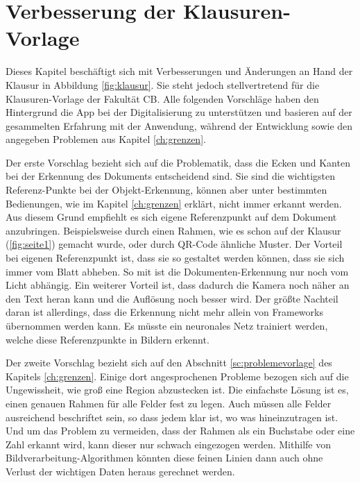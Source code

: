\documentclass[nomenclature, oneside, 150]{HSMW-Thesis}
\begin{document}

\chapter{Verbesserung der Klausuren-Vorlage}\label{ch:vorlage}
	Dieses Kapitel beschäftigt sich mit Verbesserungen und Änderungen an Hand der Klausur in Abbildung \ref{fig:klausur}. Sie steht jedoch stellvertretend für die Klausuren-Vorlage der Fakultät CB. Alle folgenden Vorschläge haben den Hintergrund die App bei der Digitalisierung zu unterstützen und basieren auf der gesammelten Erfahrung mit der Anwendung, während der Entwicklung sowie den angegeben Problemen aus Kapitel \ref{ch:grenzen}.
	
	Der erste Vorschlag bezieht sich auf die Problematik, dass die Ecken und Kanten bei der Erkennung des Dokuments entscheidend sind. Sie sind die wichtigsten Referenz-Punkte bei der Objekt-Erkennung, können aber unter bestimmten Bedienungen, wie im Kapitel \ref{ch:grenzen} erklärt, nicht immer erkannt werden. Aus diesem Grund empfiehlt es sich eigene Referenzpunkt auf dem Dokument anzubringen. Beispielsweise durch einen Rahmen, wie es schon auf der Klausur (\ref{fig:seite1}) gemacht wurde, oder durch QR-Code ähnliche Muster. Der Vorteil bei eigenen Referenzpunkt ist, dass sie so gestaltet werden können, dass sie sich immer vom Blatt abheben. So mit ist die Dokumenten-Erkennung nur noch vom Licht abhängig. Ein weiterer Vorteil ist, dass dadurch die Kamera noch näher an den Text heran kann und die Auflösung noch besser wird. Der größte Nachteil daran ist allerdings, dass die Erkennung nicht mehr allein von Frameworks übernommen werden kann. Es müsste ein neuronales Netz trainiert werden, welche diese Referenzpunkte in Bildern erkennt. 
	
	Der zweite Vorschlag bezieht sich auf den Abschnitt \ref{sc:problemevorlage} des Kapitels \ref{ch:grenzen}. Einige dort angesprochenen Probleme bezogen sich auf die Ungewissheit, wie groß eine Region abzustecken ist. Die einfachste Lösung ist es, einen genauen Rahmen für alle Felder fest zu legen. Auch müssen alle Felder ausreichend beschriftet sein, so dass jedem klar ist, wo was hineinzutragen ist. Und um das Problem zu vermeiden, dass der Rahmen als ein Buchstabe oder eine Zahl erkannt wird, kann dieser nur schwach eingezogen werden. Mithilfe von Bildverarbeitung-Algorithmen könnten diese feinen Linien dann auch ohne Verlust der wichtigen Daten heraus gerechnet werden.     
\end{document}
